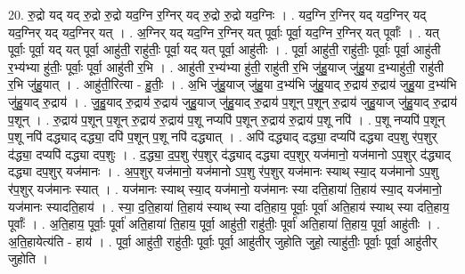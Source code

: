 \documentclass[17pt]{extarticle}
\begin{document}
20. रु॒द्रो यद् यद् रु॒द्रो रु॒द्रो यद॒ग्नि र॒ग्निर् यद् रु॒द्रो रु॒द्रो यद॒ग्निः । . यद॒ग्नि र॒ग्निर् यद् यद॒ग्निर् यद् यद॒ग्निर् यद् यद॒ग्निर् यत् । . अ॒ग्निर् यद् यद॒ग्नि र॒ग्निर् यत् पूर्वाः॒ पूर्वा॒ यद॒ग्नि र॒ग्निर् यत् पूर्वाः᳚ । . यत् पूर्वाः॒ पूर्वा॒ यद् यत् पूर्वा॒ आहु॑ती॒ राहु॑तीः॒ पूर्वा॒ यद् यत् पूर्वा॒ आहु॑तीः । . पूर्वा॒ आहु॑ती॒ राहु॑तीः॒ पूर्वाः॒ पूर्वा॒ आहु॑ती र॒भ्य॑भ्या हु॑तीः॒ पूर्वाः॒ पूर्वा॒ आहु॑ती र॒भि । . आहु॑ती र॒भ्य॑भ्या हु॑ती॒ राहु॑ती र॒भि जु॑हु॒याज् जु॑हु॒या द॒भ्याहु॑ती॒ राहु॑ती र॒भि जु॑हु॒यात् । . आहु॑ती॒रित्या - हु॒तीः॒ । . अ॒भि जु॑हु॒याज् जु॑हु॒या द॒भ्य॑भि जु॑हु॒याद् रु॒द्राय॑ रु॒द्राय॑ जुहु॒या द॒भ्य॑भि जु॑हु॒याद् रु॒द्राय॑ । . जु॒हु॒याद् रु॒द्राय॑ रु॒द्राय॑ जुहु॒याज् जु॑हु॒याद् रु॒द्राय॑ प॒शून् प॒शून् रु॒द्राय॑ जुहु॒याज् जु॑हु॒याद् रु॒द्राय॑ प॒शून् । . रु॒द्राय॑ प॒शून् प॒शून् रु॒द्राय॑ रु॒द्राय॑ प॒शू नप्यपि॑ प॒शून् रु॒द्राय॑ रु॒द्राय॑ प॒शू नपि॑ । . प॒शू नप्यपि॑ प॒शून् प॒शू नपि॑ दद्ध्याद् दद्ध्या॒ दपि॑ प॒शून् प॒शू नपि॑ दद्ध्यात् । . अपि॑ दद्ध्याद् दद्ध्या॒ दप्यपि॑ दद्ध्या दप॒शु र॑प॒शुर् द॑द्ध्या॒ दप्यपि॑ दद्ध्या दप॒शुः । . द॒द्ध्या॒ द॒प॒शु र॑प॒शुर् द॑द्ध्याद् दद्ध्या दप॒शुर् यज॑मानो॒ यज॑मानो ऽप॒शुर् द॑द्ध्याद् दद्ध्या दप॒शुर् यज॑मानः । . अ॒प॒शुर् यज॑मानो॒ यज॑मानो ऽप॒शु र॑प॒शुर् यज॑मानः स्याथ् स्या॒द् यज॑मानो ऽप॒शु र॑प॒शुर् यज॑मानः स्यात् । . यज॑मानः स्याथ् स्या॒द् यज॑मानो॒ यज॑मानः स्या दति॒हाया॑ ति॒हाय॑ स्या॒द् यज॑मानो॒ यज॑मानः स्यादति॒हाय॑ । . स्या॒ द॒ति॒हाया॑ ति॒हाय॑ स्याथ् स्या दति॒हाय॒ पूर्वाः॒ पूर्वा॑ अति॒हाय॑ स्याथ् स्या दति॒हाय॒ पूर्वाः᳚ । . अ॒ति॒हाय॒ पूर्वाः॒ पूर्वा॑ अति॒हाया॑ ति॒हाय॒ पूर्वा॒ आहु॑ती॒ राहु॑तीः॒ पूर्वा॑ अति॒हाया॑ ति॒हाय॒ पूर्वा॒ आहु॑तीः । . अ॒ति॒हायेत्य॑ति - हाय॑ । . पूर्वा॒ आहु॑ती॒ राहु॑तीः॒ पूर्वाः॒ पूर्वा॒ आहु॑तीर् जुहोति जुहो॒ त्याहु॑तीः॒ पूर्वाः॒ पूर्वा॒ आहु॑तीर् जुहोति । \newline
\end{document}
